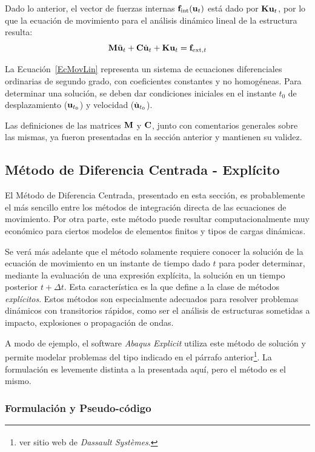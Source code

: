 Dado lo anterior, el vector de fuerzas internas ${\bf f}_{\text{int}}({\bf u}_t)$ está dado por ${\bf K} {\bf u}_t$, por lo que la ecuación de movimiento para el análisis dinámico lineal de la estructura resulta:
%
\begin{equation}\label{EcMovLin}
	{\bf M} \ddot{{\bf u}}_t + {\bf C} \dot{{\bf u}}_t + {\bf K} {\bf u}_t = {\bf f}_{\text{ext},t}
\end{equation}

La Ecuación~\eqref{EcMovLin} representa un sistema de ecuaciones diferenciales ordinarias de segundo grado, con coeficientes constantes y no homogéneas. Para determinar una solución, se deben dar condiciones iniciales en el instante $t_0$ de desplazamiento (${\bf u}_{t_0}$) y velocidad ($\dot{{\bf u}}_{t_0}$).

Las definiciones de las matrices ${\bf M}$ y ${\bf C}$, junto con comentarios generales sobre las mismas, ya fueron presentadas en la sección anterior y mantienen su validez.


\subsection{Método de Diferencia Centrada - Explícito}

El Método de Diferencia Centrada, presentado en esta sección, es probablemente el más sencillo entre los métodos de integración directa de las ecuaciones de movimiento. %
%
Por otra parte, este método puede resultar computacionalmente muy económico para ciertos modelos de elementos finitos y tipos de cargas dinámicas. 


Se verá más adelante que el método solamente requiere conocer la solución de la ecuación de movimiento en un instante de tiempo dado $t$ para poder determinar, mediante la evaluación de una expresión explícita, la solución en un tiempo posterior $t+\Delta t$. %
%
Esta característica es la que define a la clase de métodos \textit{explícitos}. %
%
Estos métodos son especialmente adecuados para resolver problemas dinámicos con transitorios rápidos, como ser el análisis de estructuras sometidas a impacto, explosiones o propagación de ondas.

A modo de ejemplo, el software \textit{Abaqus Explicit} utiliza este método de solución y permite modelar problemas del tipo indicado en el párrafo anterior\footnote{ver sitio web de \textit{Dassault Systèmes}\textsuperscript{\textregistered}.}. %
%
La formulación es levemente distinta a la presentada aquí, pero el método es el mismo.

\subsubsection{Formulación y Pseudo-código}

